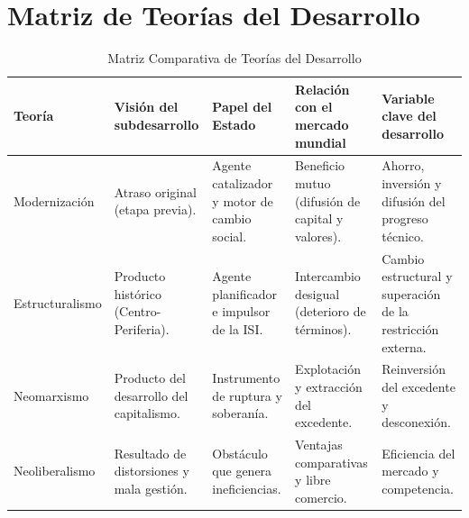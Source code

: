 \documentclass[
  letterpaper,
  DIV=11,
  numbers=noendperiod]{scrartcl}
\author{}
\date{}
\begin{document}
\section{Matriz de Teorías del
Desarrollo}\label{matriz-de-teoruxedas-del-desarrollo}

\begin{table}[H]
\caption{Matriz Comparativa de Teorías del Desarrollo}
\label{tbl-matriz}
\scriptsize
\begin{tabularx}{\linewidth}{>{\raggedright\arraybackslash}p{2.1cm}XXXX}
\toprule
\textbf{Teoría} & \textbf{Visión del subdesarrollo} & \textbf{Papel del Estado} & \textbf{Relación con el mercado mundial} & \textbf{Variable clave del desarrollo} \\ \midrule
Modernización & Atraso original (etapa previa). & Agente catalizador y motor de cambio social. & Beneficio mutuo (difusión de capital y valores). & Ahorro, inversión y difusión del progreso técnico. \\ \addlinespace
Estructuralismo & Producto histórico (Centro-Periferia). & Agente planificador e impulsor de la ISI. & Intercambio desigual (deterioro de términos). & Cambio estructural y superación de la restricción externa. \\ \addlinespace
Neomarxismo & Producto del desarrollo del capitalismo. & Instrumento de ruptura y soberanía. & Explotación y extracción del excedente. & Reinversión del excedente y desconexión. \\ \addlinespace
Neoliberalismo & Resultado de distorsiones y mala gestión. & Obstáculo que genera ineficiencias. & Ventajas comparativas y libre comercio. & Eficiencia del mercado y competencia. \\ \bottomrule
\end{tabularx}
\end{table}
\end{document}
